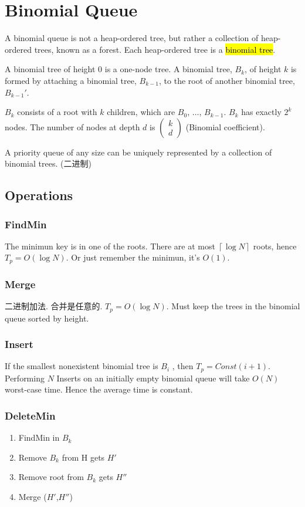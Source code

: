 \newpage
\section{Binomial Queue}
A binomial queue is not a heap-ordered tree, but rather a collection of heap-ordered trees, known as a forest. Each heap-ordered tree is a \hl{binomial tree}. 

A binomial tree of height 0 is a one-node tree. A binomial tree, $B_k$, of height $k$ is formed by attaching a binomial tree, $B_{k-1}$, to the root of another binomial tree, $B_{k-1}'$. 

$B_k$ consists of a root with $k$ children, which are $B_0$, $\dots$, $B_{k-1}$. $B_k$ has exactly $2^k$ nodes. The number of nodes at depth $d$ is $\begin{pmatrix}
    k\\d
\end{pmatrix}$ (Binomial coefficient).

A priority queue of any size can be uniquely represented by a collection of binomial trees. (二进制)

\subsection{Operations}

\subsubsection{FindMin}
The minimun key is in one of the roots. There are at most $\left\lceil \log N \right\rceil$ roots, hence $T_p=O(\log N)$. Or just remember the minimun, it's $O(1)$. 

\subsubsection{Merge}
二进制加法. 合并是任意的. $T_p=O(\log N)$. 
Must keep the trees in the binomial queue sorted by height.

\subsubsection{Insert}
If the smallest nonexistent binomial tree is $B_i$ , then $T_p=Const(i+1)$. Performing $N$ Inserts on an initially empty binomial queue will take $O(N)$ worst-case time.  Hence the average time is constant.

\subsubsection{DeleteMin}
\begin{enumerate}
    \item FindMin in $B_k$
    \item Remove $B_k$ from H gets $H'$
    \item Remove root from $B_k$ gets $H''$
    \item Merge ($H'$,$H''$)
\end{enumerate}


